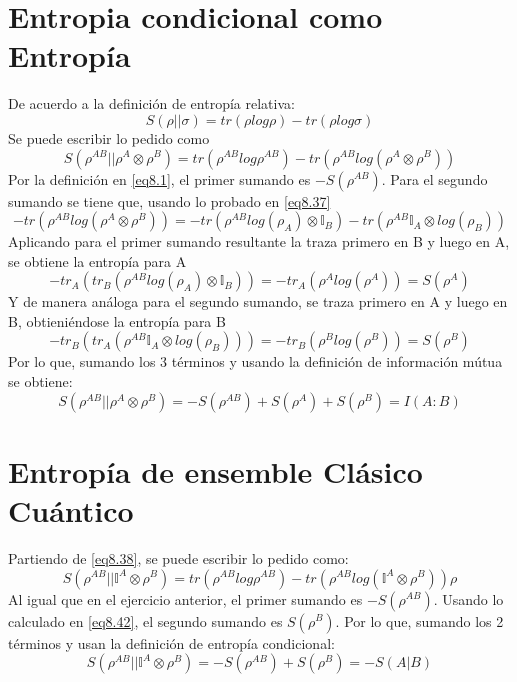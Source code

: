 \documentclass{book}
\begin{document}
\section{{Entropia condicional como Entropía}}
De acuerdo a la definición de entropía relativa:
    \begin{equation}\label{eq8.38}{ S(\rho||\sigma)=tr(\rho log\rho)-tr(\rho log \sigma)}\end{equation}
    Se puede escribir lo pedido como
    \begin{equation}\label{eq8.39}{ S(\rho^{AB}||\rho^A\otimes\rho^B)=tr(\rho^{AB}log\rho^{AB})-tr(\rho^{AB}log(\rho^A\otimes\rho^B))}\end{equation}
    Por la definición en \ref{eq8.1}, el primer sumando es $-S(\rho^{AB})$. Para el segundo sumando se tiene que, usando lo probado en \ref{eq8.37} \begin{equation} \label{eq8.40}{ -tr(\rho^{AB}log(\rho^A\otimes\rho^B))=-tr(\rho^{AB}log(\rho_A)\otimes\mathbb{I}_B)-tr(\rho^{AB}\mathbb{I}_A\otimes log(\rho_B))}\end{equation}
    Aplicando para el primer sumando resultante la traza primero en B y luego en A, se obtiene la entropía para A
    \begin{equation}\label{eq8.41}{ -tr_A(tr_B(\rho^{AB}log(\rho_A)\otimes\mathbb{I}_B))=-tr_A(\rho^Alog(\rho^A))=S(\rho^A)}\end{equation}
    Y de manera análoga para el segundo sumando, se traza primero en A y luego en B, obtieniéndose la entropía para B
    \begin{equation}\label{eq8.42}{ -tr_B(tr_A(\rho^{AB}\mathbb{I}_A\otimes log(\rho_B)))=-tr_B(\rho^Blog(\rho^B))=S(\rho^B)}\end{equation}
    Por lo que, sumando los 3 términos y usando la definición de información mútua se obtiene:
    \begin{equation}\label{eq8.43}{ S(\rho^{AB}||\rho^A\otimes\rho^B)=-S(\rho^{AB})+S(\rho^A)+S(\rho^B)=I(A:B)}\end{equation}
    \section{{Entropía de ensemble Clásico Cuántico}} Partiendo de \ref{eq8.38}, se puede escribir lo pedido como:
    \begin{equation}\label{eq8.44}{S(\rho^{AB}||\mathbb{I}^A\otimes\rho^B)=tr(\rho^{AB} log\rho^{AB})-tr(\rho^{AB}log(\mathbb{I}^A\otimes\rho^B))\rho}\end{equation}
    Al igual que en el ejercicio anterior, el primer sumando es $-S(\rho^{AB})$. Usando lo calculado en \ref{eq8.42}, el segundo sumando es $S(\rho^B)$. Por lo que, sumando los 2 términos y usan la definición de entropía condicional:
    \begin{equation}\label{eq8.45}{S(\rho^{AB}||\mathbb{I}^A\otimes\rho^B)=-S(\rho^{AB})+S(\rho^B)=-S(A|B)}\end{equation}
\end{document}
